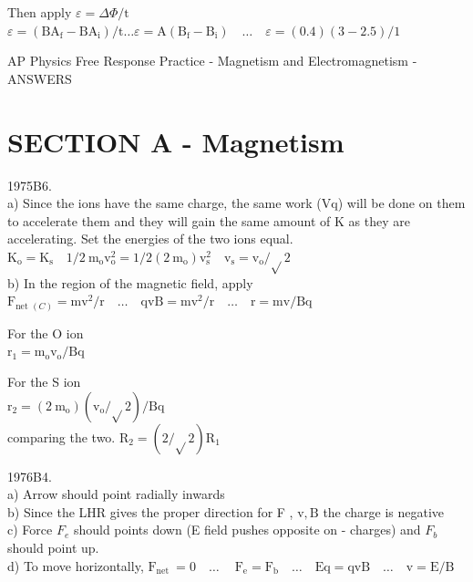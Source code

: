 \begin{enumerate}
Then apply $\varepsilon=\Delta \Phi / \mathrm{t}$\\
$\varepsilon=\left(\mathrm{BA}_{\mathrm{f}}-\mathrm{BA}_{\mathrm{i}}\right) / \mathrm{t} \ldots \varepsilon=\mathrm{A}\left(\mathrm{B}_{\mathrm{f}}-\mathrm{B}_{\mathrm{i}}\right) \quad \ldots \quad \varepsilon=(0.4)(3-2.5) / 1$

AP Physics Free Response Practice - Magnetism and Electromagnetism - ANSWERS

\section*{SECTION A - Magnetism}
1975B6.\\
a) Since the ions have the same charge, the same work (Vq) will be done on them to accelerate them and they will gain the same amount of K as they are accelerating. Set the energies of the two ions equal.\\
$\mathrm{K}_{\mathrm{o}}=\mathrm{K}_{\mathrm{s}} \quad 1 / 2 \mathrm{~m}_{\mathrm{o}} \mathrm{v}_{\mathrm{o}}^{2}=1 / 2\left(2 \mathrm{~m}_{\mathrm{o}}\right) \mathrm{v}_{\mathrm{s}}^{2} \quad \mathrm{v}_{\mathrm{s}}=\mathrm{v}_{\mathrm{o}} / \sqrt{ } 2$\\
b) In the region of the magnetic field, apply $\mathrm{F}_{\text {net }(C)}=\mathrm{mv}^{2} / \mathrm{r} \quad \ldots \quad \mathrm{qvB}=\mathrm{mv}^{2} / \mathrm{r} \quad \ldots \quad \mathrm{r}=\mathrm{mv} / \mathrm{Bq}$

For the O ion\\
$\mathrm{r}_{1}=\mathrm{m}_{\mathrm{o}} \mathrm{v}_{\mathrm{o}} / \mathrm{Bq}$

For the S ion\\
$\mathrm{r}_{2}=\left(2 \mathrm{~m}_{\mathrm{o}}\right)\left(\mathrm{v}_{\mathrm{o}} / \sqrt{ } 2\right) / \mathrm{Bq}$\\
comparing the two. $\mathrm{R}_{2}=(2 / \sqrt{ } 2) \mathrm{R}_{1}$

1976B4.\\
a) Arrow should point radially inwards\\
b) Since the LHR gives the proper direction for F , $\mathrm{v}, \mathrm{B}$ the charge is negative\\
c) Force $F_{e}$ should points down (E field pushes opposite on - charges) and $F_{b}$ should point up.\\
d) To move horizontally, $\mathrm{F}_{\text {net }}=0 \quad \ldots \quad \mathrm{~F}_{\mathrm{e}}=\mathrm{F}_{\mathrm{b}} \quad \ldots \quad \mathrm{Eq}=\mathrm{qvB} \quad \ldots \quad \mathrm{v}=\mathrm{E} / \mathrm{B}$


\end{enumerate}
